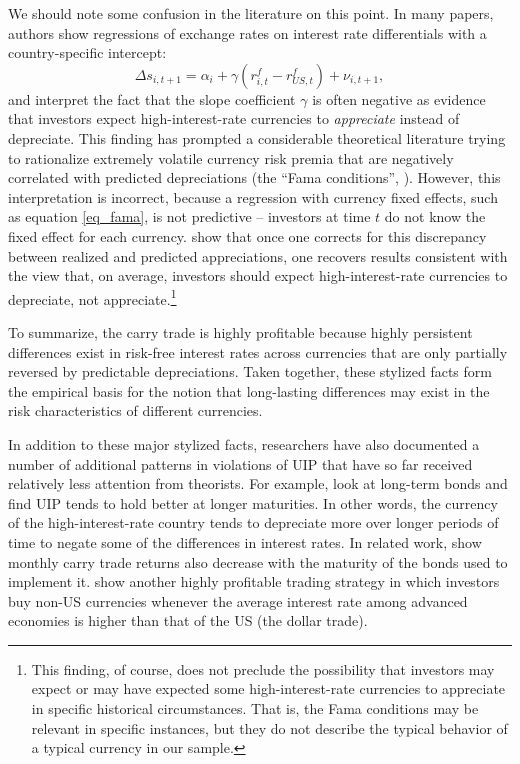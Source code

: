 \documentclass{ar-1col}
\begin{document}
We should note some confusion in the literature on this point. In many papers, authors show regressions of exchange rates on interest rate differentials with a country-specific intercept:
\begin{equation}
    \Delta s_{i,t+1} 
    = \alpha_i + \gamma \left(r^f_{i, t} - r^f_{US, t}\right) + \nu_{i, t+1},
\label{eq_fama} 
\end{equation}
and interpret the fact that the slope coefficient $\gamma$ is often negative as evidence that investors expect high-interest-rate currencies to \textit{appreciate} instead of depreciate. This finding has prompted a considerable theoretical literature trying to rationalize extremely volatile currency risk premia that are negatively correlated with predicted depreciations (the ``Fama conditions'', \citet{Backusetal2001}). However, this interpretation is incorrect, because a regression with currency fixed effects, such as equation \ref{eq_fama}, is not predictive -- investors at time $t$ do not know the fixed effect for each currency. \citet{HassanMano2019} show that once one corrects for this discrepancy between realized and predicted appreciations, one recovers results consistent with the view that, on average, investors should expect high-interest-rate currencies to depreciate, not appreciate.\footnote{This finding, of course, does not preclude the possibility that investors may expect or may have expected some high-interest-rate currencies to appreciate in specific historical circumstances. That is, the Fama conditions may be relevant in specific instances, but they do not describe the typical behavior of a typical currency in our sample.}

To summarize, the carry trade is highly profitable because highly persistent differences exist in risk-free interest rates across currencies that are only partially reversed by predictable depreciations. Taken together, these stylized facts form the empirical basis for the notion that long-lasting differences may exist in the risk characteristics of different currencies.

In addition to these major stylized facts, researchers have also documented a number of additional patterns in violations of UIP that have so far received relatively less attention from theorists. For example, \citet{ChinnMeredith2004} look at long-term bonds and find UIP tends to hold better at longer maturities. In other words, the currency of the high-interest-rate country tends to depreciate more over longer periods of time to negate some of the differences in interest rates. In related work, \citet{LustigStathopoulosVerdelhan2019} show monthly carry trade returns also decrease with the maturity of the bonds used to implement it. \citet{LRV2014} show another highly profitable trading strategy in which investors buy non-US currencies whenever the average interest rate among advanced economies is higher than that of the US (the dollar trade). 
\end{document}
